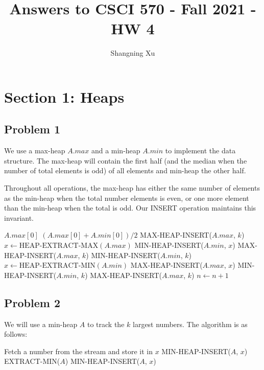 \documentclass{article}
\title{Answers to CSCI 570 - Fall 2021 - HW 4}
\author{Shangning Xu}
\begin{document}
\maketitle

\section*{Section 1: Heaps}

\subsection*{Problem 1}

We use a max-heap $A.max$ and a min-heap $A.min$ to implement the data structure. The max-heap will contain the first half (and the median when the number of total elements is odd) of all elements and min-heap the other half.

Throughout all operations, the max-heap has either the same number of elements as the min-heap when the total number elements is even, or one more element than the min-heap when the total is odd. Our INSERT operation maintains this invariant.

\begin{algorithmic}[1]
            \State \Return $A.max[0]$
        \Else
            \State \Return $(A.max[0] + A.min[0])/2$
        \EndIf
    \EndFunction
            \State MAX-HEAP-INSERT($A.max$, $k$)
                \State $x \gets \textrm{HEAP-EXTRACT-MAX}(A.max)$
                \State MIN-HEAP-INSERT($A.min$, $x$)
                \State MAX-HEAP-INSERT($A.max$, $k$)
            \Else
                \State MIN-HEAP-INSERT($A.min$, $k$)
            \EndIf
            \State $x \gets \textrm{HEAP-EXTRACT-MIN}(A.min)$
            \State MAX-HEAP-INSERT($A.max$, $x$)
            \State MIN-HEAP-INSERT($A.min$, $k$)
        \Else
            \State MAX-HEAP-INSERT($A.max$, $k$)
        \EndIf
        \State $n \gets n + 1$
    \EndFunction
\end{algorithmic}

\subsection*{Problem 2}

We will use a min-heap $A$ to track the $k$ largest numbers. The algorithm is as follows:
\begin{algorithmic}[1]
        \State Fetch a number from the stream and store it in $x$
            \State MIN-HEAP-INSERT($A$, $x$)
            \State EXTRACT-MIN($A$)
            \State MIN-HEAP-INSERT($A$, $x$)
        \EndIf
    \EndWhile
\end{algorithmic}
\end{document}
